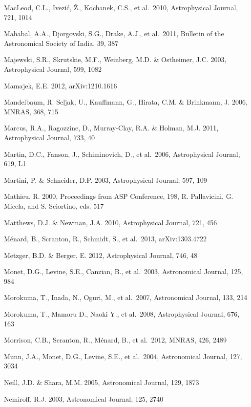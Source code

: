 \documentclass{emulateapj}
\begin{document}
\begin{thebibliography}{}
\bibitem[()]{} MacLeod, C.L., Ivezi\'{c}, \v{Z}., Kochanek, C.S., et al.~2010, Astrophysical Journal, 721, 1014

\bibitem[()]{} Mahabal, A.A., Djorgovski, S.G., Drake, A.J., et al.~2011, Bulletin of the Astronomical Society of India, 39, 387

\bibitem[()]{} Majewski, S.R., Skrutskie, M.F., Weinberg, M.D. \& Ostheimer, J.C. 2003, 
             Astrophysical Journal, 599, 1082

\bibitem[()]{} Mamajek, E.E. 2012, arXiv:1210.1616

\bibitem[()]{} Mandelbaum, R. Seljak, U., Kauffmann, G., Hirata, C.M. \& Brinkmann, J. 2006, MNRAS, 368, 715

\bibitem[()]{} Marcus, R.A., Ragozzine, D., Murray-Clay, R.A. \& Holman, M.J. 2011, Astrophysical Journal, 733, 40

\bibitem[()]{} Martin, D.C., Fanson, J., Schiminovich, D., et al.~2006, Astrophysical Journal, 619, L1

\bibitem[()]{} Martini, P. \& Schneider, D.P. 2003, Astrophysical Journal, 597, 109

\bibitem[()]{} Mathieu, R. 2000, Proceedings from ASP Conference, 198, R. Pallavicini, G. Micela, and 
             S. Sciortino, eds. 517

\bibitem[()]{} Matthews, D.J. \& Newman, J.A. 2010, Astrophysical Journal, 721, 456

\bibitem[()]{} M\'{e}nard, B., Scranton, R., Schmidt, S., et al.~2013, arXiv:1303.4722

\bibitem[()]{} Metzger, B.D. \& Berger, E. 2012, Astrophysical Journal, 746, 48

\bibitem[()]{} Monet, D.G., Levine, S.E., Canzian, B., et al.~2003, Astronomical Journal, 125, 984

\bibitem[()]{} Morokuma, T., Inada, N., Oguri, M., et al.~2007, Astronomical Journal, 133, 214

\bibitem[()]{} Morokuma, T., Mamoru D., Naoki Y., et al.~2008, Astrophysical Journal, 676, 163	

\bibitem[()]{} Morrison, C.B., Scranton, R., M\'{e}nard, B., et al.~2012, MNRAS, 426, 2489

\bibitem[()]{} Munn, J.A., Monet, D.G., Levine, S.E., et al.~2004, Astronomical Journal, 127, 3034
	
\bibitem[()]{} Neill, J.D. \& Shara, M.M. 2005, Astronomical Journal, 129, 1873

\bibitem[()]{} Nemiroff, R.J. 2003, Astronomical Journal, 125, 2740


\end{thebibliography}
\end{document}
